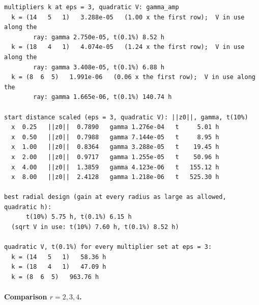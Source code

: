 {\begin{verbatim}
multipliers k at eps = 3, quadratic V: gamma_amp
  k = (14   5   1)   3.288e-05   (1.00 x the first row);  V in use along the
        ray: gamma 2.750e-05, t(0.1%) 8.52 h
  k = (18   4   1)   4.074e-05   (1.24 x the first row);  V in use along the
        ray: gamma 3.408e-05, t(0.1%) 6.88 h
  k = (8  6  5)   1.991e-06   (0.06 x the first row);  V in use along the
        ray: gamma 1.665e-06, t(0.1%) 140.74 h

start distance scaled (eps = 3, quadratic V): ||z0||, gamma, t(10%)
  x  0.25   ||z0||  0.7890   gamma 1.276e-04   t     5.01 h
  x  0.50   ||z0||  0.7988   gamma 7.144e-05   t     8.95 h
  x  1.00   ||z0||  0.8364   gamma 3.288e-05   t    19.45 h
  x  2.00   ||z0||  0.9717   gamma 1.255e-05   t    50.96 h
  x  4.00   ||z0||  1.3859   gamma 4.123e-06   t   155.12 h
  x  8.00   ||z0||  2.4128   gamma 1.218e-06   t   525.30 h

best radial design (gain at every radius as large as allowed, quadratic h):
      t(10%) 5.75 h, t(0.1%) 6.15 h
  (sqrt V in use: t(10%) 7.60 h, t(0.1%) 8.52 h)

quadratic V, t(0.1%) for every multiplier set at eps = 3:
  k = (14   5   1)   58.36 h
  k = (18   4   1)   47.09 h
  k = (8  6  5)   963.76 h
\end{verbatim}}

\paragraph{Comparison $r=2,3,4$.}

